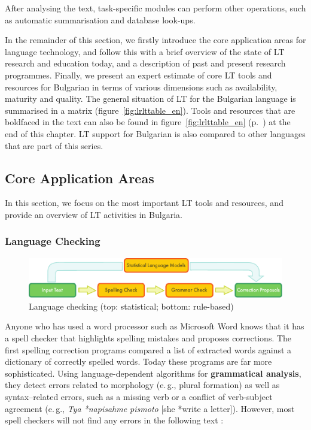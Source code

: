 \documentclass[]{../../metanetpaper}
\begin{document}
\begin{multicols}{2}
After analysing the text, task-specific modules can perform other operations, such as automatic summarisation and database look-ups.

In the remainder of this section, we firstly introduce the core application areas for language technology, and follow this with a brief overview of the state of LT research and education today, and a description of past and present research programmes. Finally, we present an expert estimate of core LT tools and resources for Bulgarian in terms of various dimensions such as availability, maturity and quality. The general situation of LT for the Bulgarian language is summarised in a matrix (figure~\ref{fig:lrlttable_en}). Tools and resources that are boldfaced in the text can also be found in figure~\ref{fig:lrlttable_en} (p.~\pageref{fig:lrlttable_en}) at the end of this chapter. LT support for Bulgarian is also compared to other languages that are part of this series.

\subsection{Core Application Areas}

In this section, we focus on the most important LT tools and resources, and provide an overview of LT activities in Bulgaria. 

\subsubsection{Language Checking}

\begin{figure}[t]
  \center
  \includegraphics[width=\textwidth]{../_media/english/language_checking}
  \caption{Language checking (top: statistical; bottom: rule-based)}
  \label{fig:langcheckingaarch_en}
\end{figure}

Anyone who has used a word processor such as Microsoft Word knows that it has a spell checker that highlights spelling mistakes and proposes corrections. The first spelling correction programs compared a list of extracted words against a dictionary of correctly spelled words. Today these programs are far more sophisticated. Using language-dependent algorithms for \textbf{grammatical analysis}, they detect errors related to morphology (e.\,g., plural formation) as well as syntax–related errors, such as a missing verb or a conflict of verb-subject agreement  (e.\,g., \textit{Tya *napisahme pismoto} [she *write a letter]). However, most spell checkers will not find any errors in the following text \cite{zar1}:


\end{multicols}
\end{document}

